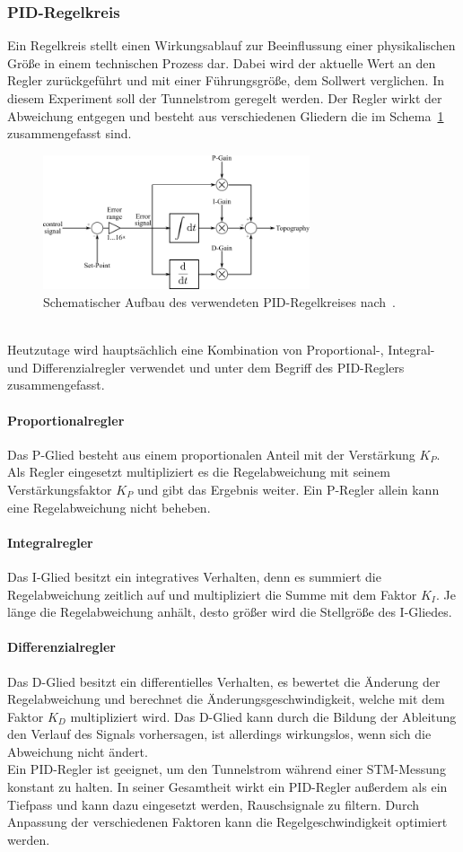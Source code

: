 \documentclass[a4paper,twoside,final]{article}
\begin{document}
\subsubsection{PID-Regelkreis}
Ein Regelkreis stellt einen Wirkungsablauf zur Beeinflussung einer physikalischen Größe in einem technischen Prozess dar. Dabei wird der aktuelle Wert an den Regler zurückgeführt und mit einer Führungsgröße, dem Sollwert verglichen. In diesem Experiment soll der Tunnelstrom geregelt werden. Der Regler wirkt der Abweichung entgegen und besteht aus verschiedenen Gliedern die im Schema~\ref{fig:PID} zusammengefasst sind.
\begin{figure}[htp]
    \centering
    \includegraphics[width=0.7\textwidth]{Bilder/PID-Regler.pdf}
    \caption{Schematischer Aufbau des verwendeten PID-Regelkreises nach~\cite{Versuchsanleitung}.}
    \label{fig:PID}
\end{figure}\\
Heutzutage wird hauptsächlich eine Kombination von Proportional-, Integral- und Differenzialregler verwendet und unter dem Begriff des PID-Reglers zusammengefasst.
\paragraph{Proportionalregler} Das P-Glied besteht aus einem proportionalen Anteil mit der Verstärkung $K_P$. Als Regler eingesetzt multipliziert es die Regelabweichung mit seinem Verstärkungsfaktor $K_P$ und gibt das Ergebnis weiter. Ein P-Regler allein kann eine Regelabweichung nicht beheben.
\paragraph{Integralregler} Das I-Glied besitzt ein integratives Verhalten, denn es summiert die Regelabweichung zeitlich auf und multipliziert die Summe mit dem Faktor $K_I$. Je länge die Regelabweichung anhält, desto größer wird die Stellgröße des I-Gliedes.
\paragraph{Differenzialregler} Das D-Glied besitzt ein differentielles Verhalten, es bewertet die Änderung der Regelabweichung und berechnet die Änderungsgeschwindigkeit, welche mit dem Faktor $K_D$ multipliziert wird. Das D-Glied kann durch die Bildung der Ableitung den Verlauf des Signals \glqq vorhersagen\grqq, ist allerdings wirkungslos, wenn sich die Abweichung nicht ändert.\\
Ein PID-Regler ist geeignet, um den Tunnelstrom während einer STM-Messung konstant zu halten. In seiner Gesamtheit wirkt ein PID-Regler außerdem als ein Tiefpass und kann dazu eingesetzt werden, Rauschsignale zu filtern. Durch Anpassung der verschiedenen Faktoren kann die Regelgeschwindigkeit optimiert werden.
\end{document}
